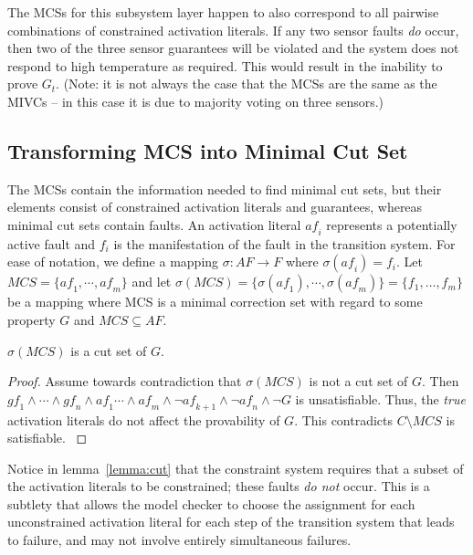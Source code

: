 The MCSs for this subsystem layer happen to also correspond to all pairwise combinations of constrained activation literals. If any two sensor faults {\em do} occur, then two of the three sensor guarantees will be violated and the system does not respond to high temperature as required. This would result in the inability to prove $G_t$. (Note: it is not always the case that the MCSs are the same as the MIVCs -- in this case it is due to majority voting on three sensors.)

\subsection{Transforming MCS into Minimal Cut Set}
The MCSs contain the information needed to find minimal cut sets, but their elements consist of constrained activation literals and guarantees, whereas minimal cut sets contain faults. An activation literal $\mathit{af}_i$ represents a potentially active fault and $f_i$ is the manifestation of the fault in the transition system. For ease of notation, we define a mapping $\sigma : AF \rightarrow F$ where $\sigma (\mathit{af}_i) = f_i$. Let $MCS = \{\mathit{af}_1, \cdots, \mathit{af}_m\}$ and let $\sigma (MCS) = \{\sigma (\mathit{af}_{1}), \cdots, \sigma (\mathit{af}_{m})\} = \{f_1, \dots, f_m\}$ be a mapping where MCS is a minimal correction set with regard to some property $G$ and $MCS  \subseteq AF$. 

\begin{lemma} $\sigma (MCS)$ is a cut set of $G$. 
\begin{proof}
Assume towards contradiction that $\sigma (MCS)$ is not a cut set of $G$. Then $\mathit{gf}_1 \land \cdots \land \mathit{gf}_n \land \mathit{af}_1 \cdots \land \mathit{af}_m \land \neg \mathit{af}_{k+1} \land \neg \mathit{af}_n \land \neg G$ is unsatisfiable. Thus, the \emph{true} activation literals do not affect the provability of $G$. This contradicts $C \setminus MCS$ is satisfiable. 
\label{lemma:cut}
\end{proof}
\end{lemma}

Notice in lemma~\ref{lemma:cut} that the constraint system requires that a subset of the activation literals to be constrained; these faults \textit{do not} occur. This is a subtlety that allows the model checker to choose the assignment for each unconstrained activation literal for each step of the transition system that leads to failure, and may not involve entirely simultaneous failures.

